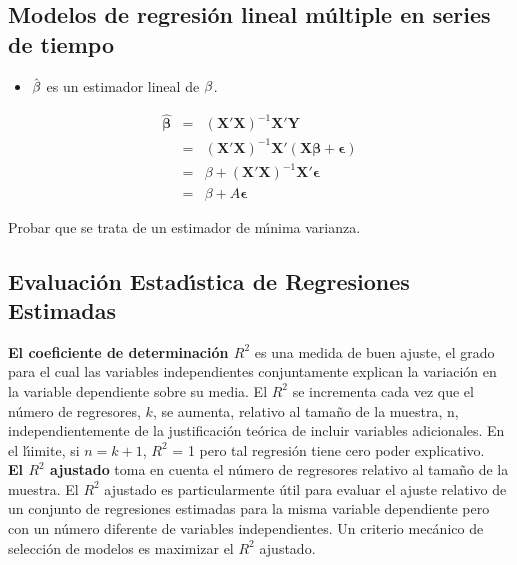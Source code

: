 \subsection{Modelos de regresi\'on lineal m\'ultiple en series de tiempo}
\begin{itemize}
	\item $\hat{\text{\ensuremath{\beta}}}$ es un estimador lineal de $\text{\ensuremath{\beta}}$. 
\end{itemize}
\begin{eqnarray*}
	\hat{\mathbf{\beta}} & = & (\mathbf{X'X})^{-1}\mathbf{X'Y}\\
	& = & (\mathbf{X'X})^{-1}\mathbf{X'}\left(\mathbf{X\beta}+\mathbf{\mathbf{\epsilon}}\right)\\
	& = & \beta+(\mathbf{X'X})^{-1}\mathbf{X'}\mathbf{\mathbf{\epsilon}}\\
	& = & \beta+A\mathbf{\mathbf{\epsilon}}
\end{eqnarray*}

Probar que se trata de un estimador de m\'\i{}nima varianza.
\subsection{Evaluaci\'on Estad\'\i{}stica de Regresiones Estimadas}

\textbf{El coeficiente de determinaci\'on $R^2$} es una medida de buen ajuste, el grado para el cual las variables independientes conjuntamente explican la variaci\'on en la variable dependiente sobre su media. El $R^2$ se incrementa cada vez que el n\'umero de regresores, $k$, se aumenta, relativo al tama\~no de la muestra, n, independientemente de la justificaci\'on te\'orica de incluir variables adicionales. En el l\'\i{}imite, si $n=k+1$, $R^2$ = 1 pero tal regresi\'on tiene cero poder explicativo. \\
\vspace{5mm}
\textbf{El $R^2$ ajustado} toma en cuenta el n\'umero de regresores relativo al tama\~no de la muestra. El $R^2$ ajustado es particularmente \'util para evaluar el ajuste relativo de un conjunto de regresiones estimadas para la misma variable dependiente pero con un n\'umero diferente de variables independientes.  Un criterio mec\'anico de selecci\'on de modelos es maximizar el $R^2$ ajustado.

